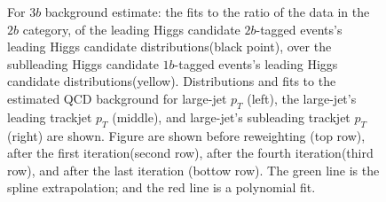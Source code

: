 \begin{figure}[htbp!]
\begin{center}
\caption{For $3b$ background estimate: the fits to the ratio of the data in the $2b$ category, of the leading Higgs candidate $2b$-tagged events's leading Higgs candidate distributions(black point), over the sublleading Higgs candidate $1b$-tagged events's leading Higgs candidate distributions(yellow). Distributions and fits to the estimated QCD background for large-\R jet $p_{T}$ (left),  the large-\R jet's leading trackjet $p_T$ (middle), and large-\R jet's subleading trackjet $p_T$ (right) are shown.  Figure are shown before reweighting (top row), after the first iteration(second row), after the fourth iteration(third row), and after the last iteration (bottow row). The green line is the spline extrapolation; and the red line is a polynomial fit.}
\label{fig:rw-3b-subl}
\end{center}
\end{figure}

